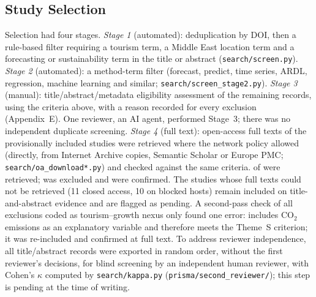 \documentclass[11pt,a4paper]{article}
\begin{document}
\subsection{Study Selection}\label{sec:selection}
Selection had four stages. \emph{Stage 1} (automated): deduplication by DOI, then a rule-based filter requiring a tourism term, a Middle East location term and a forecasting or sustainability term in the title or abstract (\texttt{search/screen.py}). \emph{Stage 2} (automated): a method-term filter (forecast, predict, time series, ARDL, regression, machine learning and similar; \texttt{search/screen\_stage2.py}). \emph{Stage 3} (manual): title/abstract/metadata eligibility assessment of the remaining records, using the criteria above, with a reason recorded for every exclusion (Appendix~E). One reviewer, an AI agent, performed Stage~3; there was no independent duplicate screening. \emph{Stage 4} (full text): open-access full texts of the provisionally included studies were retrieved where the network policy allowed (directly, from Internet Archive copies, Semantic Scholar or Europe PMC; \texttt{search/oa\_download*.py}) and checked against the same criteria. \Nftretr{} of \Nftsought{} were retrieved; \Nftexcl{} was excluded \citep[a Hajj--GDP causality study without a sustainability variable;][]{Triki2019} and \Nftconf{} were confirmed. The \Nabsonly{} studies whose full texts could not be retrieved (11 closed access, 10 on blocked hosts) remain included on title-and-abstract evidence and are flagged as pending. A second-pass check of all exclusions coded as tourism--growth nexus only found one error: \citet{Jamel2020} includes CO$_2$ emissions as an explanatory variable and therefore meets the Theme~S criterion; it was re-included and confirmed at full text. To address reviewer independence, all \Nassessed{} title/abstract records were exported in random order, without the first reviewer's decisions, for blind screening by an independent human reviewer, with Cohen's $\kappa$ computed by \texttt{search/kappa.py} (\texttt{prisma/second\_reviewer/}); this step is pending at the time of writing.
\end{document}
